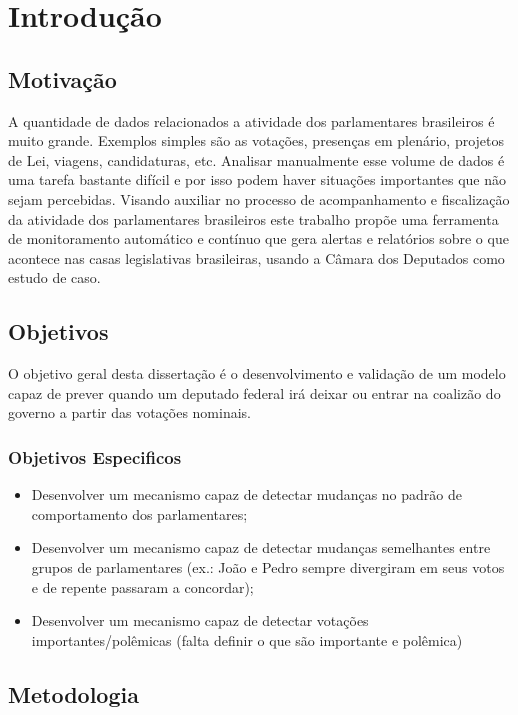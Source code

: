 \chapter{Introdução} \label{intro}

\section{Motivação}\label{sec:motiva}

A quantidade de dados relacionados a atividade dos parlamentares brasileiros é muito grande. Exemplos simples são as votações, presenças em plenário, projetos de Lei, viagens, candidaturas, etc. Analisar manualmente esse volume de dados é uma tarefa bastante difícil e por isso podem haver situações importantes que não sejam percebidas. Visando auxiliar no processo de acompanhamento e fiscalização da atividade dos parlamentares brasileiros este trabalho propõe uma ferramenta de monitoramento automático e contínuo que gera alertas e relatórios sobre o que acontece nas casas legislativas brasileiras, usando a Câmara dos Deputados como estudo de caso.

\section{Objetivos}

O objetivo geral desta dissertação é o desenvolvimento e validação de um modelo
capaz de prever quando um deputado federal irá deixar ou entrar na coalizão do
governo a partir das votações nominais.

\subsection{Objetivos Especificos}

\begin{itemize}
\item Desenvolver um mecanismo capaz de detectar mudanças no padrão de comportamento dos parlamentares;
\item Desenvolver um mecanismo capaz de detectar mudanças semelhantes entre grupos de parlamentares (ex.: João e Pedro sempre divergiram em seus votos e de repente passaram a concordar);
\item Desenvolver um mecanismo capaz de detectar votações importantes/polêmicas (falta definir o que são importante e polêmica)
\end{itemize}

\section{Metodologia}

